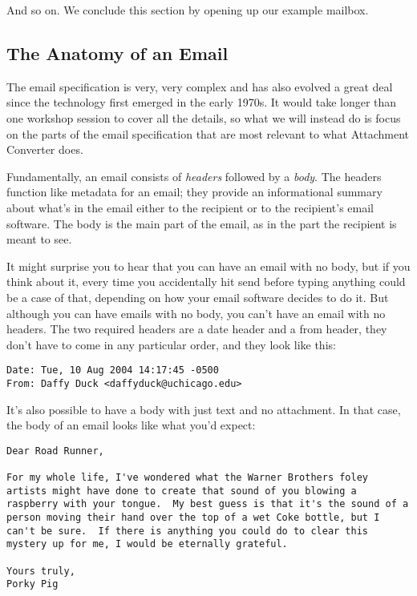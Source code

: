 \documentclass[11pt]{article}
\begin{document}
And so on.  We conclude this section by opening up our example
mailbox.

\subsection{The Anatomy of an Email}
\label{sec:org918fe90}

The email specification is very, very complex and has also evolved a
great deal since the technology first emerged in the early 1970s.  It
would take longer than one workshop session to cover all the details,
so what we will instead do is focus on the parts of the email
specification that are most relevant to what Attachment Converter
does.

Fundamentally, an email consists of \emph{headers} followed by a \emph{body}.
The headers function like metadata for an email; they provide an
informational summary about what's in the email either to the
recipient or to the recipient's email software.  The body is the main
part of the email, as in the part the recipient is meant to see.

It might surprise you to hear that you can have an email with no body,
but if you think about it, every time you accidentally hit send before
typing anything could be a case of that, depending on how your email
software decides to do it.  But although you can have emails with no
body, you can't have an email with no headers.  The two required
headers are a date header and a from header, they don't have to come
in any particular order, and they look like this:

\begin{verbatim}
Date: Tue, 10 Aug 2004 14:17:45 -0500
From: Daffy Duck <daffyduck@uchicago.edu>
\end{verbatim}

It's also possible to have a body with just text and no attachment. In
that case, the body of an email looks like what you'd expect:

\begin{verbatim}
Dear Road Runner,

For my whole life, I've wondered what the Warner Brothers foley
artists might have done to create that sound of you blowing a
raspberry with your tongue.  My best guess is that it's the sound of a
person moving their hand over the top of a wet Coke bottle, but I
can't be sure.  If there is anything you could do to clear this
mystery up for me, I would be eternally grateful.

Yours truly,
Porky Pig
\end{verbatim}
\end{document}
